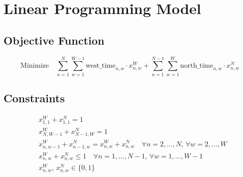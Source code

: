 \documentclass{article}
\begin{document}
\section*{Linear Programming Model}

\subsection*{Objective Function}
\[
\text{Minimize} \quad \sum_{n=1}^{N} \sum_{w=1}^{W-1} \text{west\_time}_{n,w} \cdot x_{n,w}^W + \sum_{n=1}^{N-1} \sum_{w=1}^{W} \text{north\_time}_{n,w} \cdot x_{n,w}^N
\]

\subsection*{Constraints}
\begin{align*}
& x_{1,1}^W + x_{1,1}^N = 1 \\
& x_{N,W-1}^W + x_{N-1,W}^N = 1 \\
& x_{n,w-1}^W + x_{n-1,w}^N = x_{n,w}^W + x_{n,w}^N \quad \forall n = 2,\ldots,N, \, \forall w = 2,\ldots,W \\
& x_{n,w}^W + x_{n,w}^N \leq 1 \quad \forall n = 1,\ldots,N-1, \, \forall w = 1,\ldots,W-1 \\
& x_{n,w}^W, \, x_{n,w}^N \in \{0,1\}
\end{align*}
\end{document}

